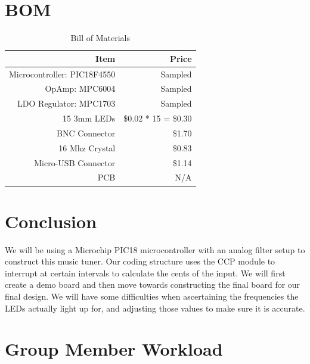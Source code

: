 \documentclass[12pt]{article}
\begin{document}
\section{BOM}
\begin{table}[!h]
   \centering
    \begin{tabular}{|r|r|}
        \hline
	Item & Price \\ \hline
	Microcontroller: PIC18F4550 & Sampled \\ \hline
	OpAmp: MPC6004 & Sampled \\ \hline
	LDO Regulator: MPC1703 & Sampled \\ \hline
	15 3mm  LEDs & \$0.02 * 15 = \$0.30 \\ \hline
	BNC Connector & \$1.70 \\ \hline
	16 Mhz Crystal & \$0.83 \\ \hline
	Micro-USB Connector & \$1.14 \\ \hline
	PCB & N/A \\ \hline
	
    \end{tabular}
	\caption{Bill of Materials}
	\label{bom} 
\end{table}


\section{Conclusion}
We will be using a Microchip PIC18 microcontroller with an analog filter setup to
construct this music tuner. Our coding structure uses the CCP module to interrupt at
certain intervals to calculate the cents of the input. We will first create a demo board
and then move towards constructing the final board for our final design. We will have some
difficulties when ascertaining the frequencies the LEDs actually light up for, and adjusting 
those values to make sure it is accurate.

\section{Group Member Workload}
\end{document}
